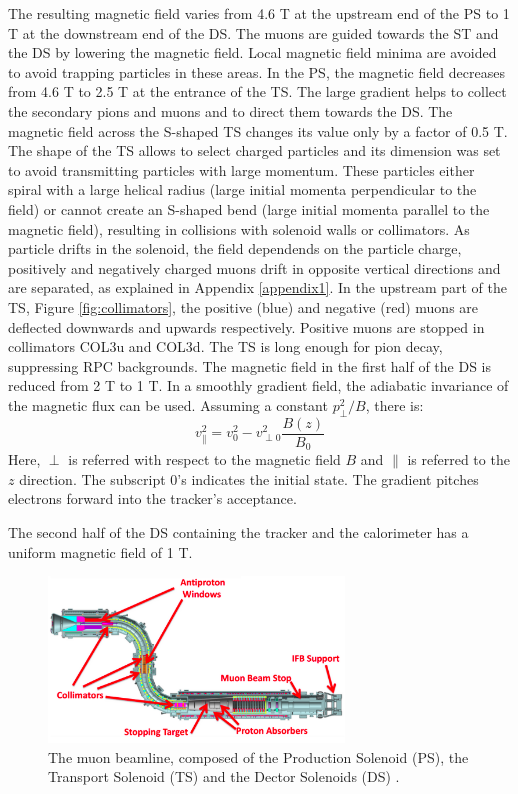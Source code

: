 The resulting magnetic field varies from 4.6 T at the upstream end of the PS 
to 1 T at the downstream end of the DS. 
The muons are guided towards the ST and the DS by lowering the magnetic field. 
Local magnetic field minima are avoided to avoid trapping particles in these areas. 
In the PS, the magnetic field decreases from 4.6 T to 2.5 T at the entrance of 
the TS. The large gradient helps to collect the secondary pions and muons and to 
direct them towards the DS. The magnetic field across the S-shaped TS changes its 
value only by a factor of 0.5 T. The shape of the TS allows to select charged particles 
and its dimension was set to avoid transmitting 
particles with large momentum. These particles either spiral with a large helical 
radius (large initial momenta perpendicular to the field) or cannot create an 
S-shaped bend (large initial momenta parallel to the magnetic field), resulting 
in collisions with solenoid walls or collimators. As particle drifts in the solenoid,  
the field dependends on the particle charge, positively and negatively charged muons 
drift in opposite vertical directions and are separated, as explained in Appendix 
\ref{appendix1}. In the upstream part of the TS, Figure 
\ref{fig:collimators}, the positive (blue) and negative (red) muons 
are deflected downwards and upwards respectively. Positive muons are stopped in 
collimators COL3u and COL3d. The TS is long enough for pion decay, suppressing 
RPC backgrounds.
The magnetic field in the first half of 
the DS is reduced from 2 T to 1 T. In a smoothly gradient field, the adiabatic 
invariance of the magnetic flux can be used. Assuming a constant $p^2_\perp/B$, there is:
\begin{equation}
    v^2_{\parallel}=v^2_0-v^2_{\perp 0}\frac{B(z)}{B_0}
\end{equation}
Here, $\perp$ is referred with respect to the magnetic field $B$ and $\parallel$ is 
referred to the $z$ direction. The subscript 0's indicates the initial state. 
The gradient pitches electrons forward into the tracker's acceptance. 

The second half of the DS containing the tracker and the calorimeter has a 
uniform magnetic field of 1 T.

\begin{figure}[!h]
\centering
\includegraphics[width =0.7\textwidth]{figures/png/Screenshot_20240303_152845.png}
\caption[The muon beamline.]{The muon beamline, composed of the Production Solenoid (PS), 
the Transport Solenoid (TS) and the Dector Solenoids (DS) \cite{ginther}. 
}
\label{fig:muonbeamline}
\end{figure}


